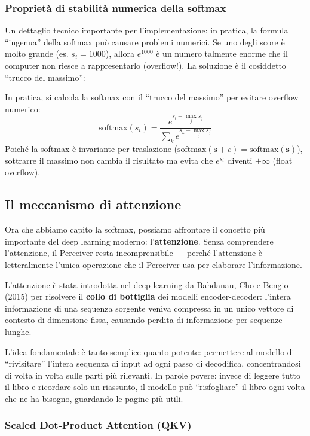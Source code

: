 \documentclass[12pt,a4paper]{article}
\begin{document}
\subsubsection{Propriet\`a di stabilit\`a numerica della softmax}

Un dettaglio tecnico importante per l'implementazione: in pratica, la formula ``ingenua'' della softmax pu\`o causare problemi numerici. Se uno degli score \`e molto grande (es. $s_i = 1000$), allora $e^{1000}$ \`e un numero talmente enorme che il computer non riesce a rappresentarlo (overflow!). La soluzione \`e il cosiddetto ``trucco del massimo'':

In pratica, si calcola la softmax con il ``trucco del massimo'' per evitare overflow numerico:
\[
    \text{softmax}(s_i) = \frac{e^{s_i - \max_j s_j}}{\sum_{k} e^{s_k - \max_j s_j}}
\]
Poich\'e la softmax \`e invariante per traslazione ($\text{softmax}(\mathbf{s} + c) = \text{softmax}(\mathbf{s})$), sottrarre il massimo non cambia il risultato ma evita che $e^{s_i}$ diventi $+\infty$ (float overflow).


\subsection{Il meccanismo di attenzione} \label{sec:attention}

Ora che abbiamo capito la softmax, possiamo affrontare il concetto pi\`u importante del deep learning moderno: l'\textbf{attenzione}. Senza comprendere l'attenzione, il Perceiver resta incomprensibile --- perch\'e l'attenzione \`e letteralmente l'unica operazione che il Perceiver usa per elaborare l'informazione.

L'attenzione \`e stata introdotta nel deep learning da Bahdanau, Cho e Bengio (2015) per risolvere il \textbf{collo di bottiglia} dei modelli encoder-decoder: l'intera informazione di una sequenza sorgente veniva compressa in un unico vettore di contesto di dimensione fissa, causando perdita di informazione per sequenze lunghe.

L'idea fondamentale \`e tanto semplice quanto potente: permettere al modello di ``rivisitare'' l'intera sequenza di input ad ogni passo di decodifica, concentrandosi di volta in volta sulle parti pi\`u rilevanti. In parole povere: invece di leggere tutto il libro e ricordare solo un riassunto, il modello pu\`o ``risfogliare'' il libro ogni volta che ne ha bisogno, guardando le pagine pi\`u utili.

\subsubsection{Scaled Dot-Product Attention (QKV)}
\end{document}
